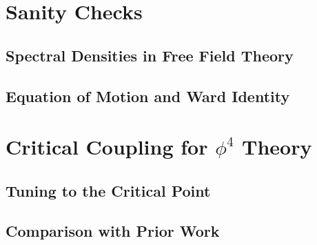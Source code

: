 


\section{Sanity Checks}
\label{sec:SanityChecks}




\subsection{Spectral Densities in Free Field Theory}





\subsection{Equation of Motion and Ward Identity}






\section{Critical Coupling for $\phi^4$ Theory}
\label{sec:Coupling}



\subsection{Tuning to the Critical Point}





\subsection{Comparison with Prior Work}
\label{subsec:compare}



